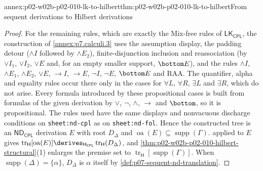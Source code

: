\begin{annexitem}{annex:p02-w02b-p02-010-lk-to-hilbert}{thm:p02-w02b-p02-010-lk-to-hilbert}{From sequent derivations to Hilbert derivations}
\begin{proof}
For the remaining rules, which are exactly the Mix-free rules of
\(\mathsf{LK}_{\mathsf{CPL}}\), the construction of \cref{annex:p7.calculi.3}
uses the assumption display, the padding detour
(\(\land I\) followed by \(\land E_2\)), finite-disjunction inclusion and
reassociation (by \(\lor I_1\), \(\lor I_2\), \(\lor E\) and, for an empty
smaller support, \(\bottom E\)), and the rules \(\land I\), \(\land E_1\),
\(\land E_2\), \(\lor E\), \(\to I\), \(\to E\), \(\neg I\), \(\neg E\),
\(\bottom E\) and RAA.  The quantifier, alpha and equality rules occur there
only in the cases for \(\forall L\), \(\forall R\), \(\exists L\) and
\(\exists R\), which do not arise.  Every formula introduced by these
propositional cases is built from formulas of the given derivation by
\(\lor\), \(\neg\), \(\land\), \(\to\) and \(\bottom\), so it is
propositional.  The rules used have the same displays and nonvacuous
discharge conditions on \texttt{sheet:\allowbreak nd-cpl} as on
\texttt{sheet:\allowbreak nd-fol}.  Hence the constructed tree
is an \(\mathsf{ND}_{\mathsf{CPL}}\) derivation \(E\) with root \(D_\Delta\)
and \(\operatorname{oa}(E)\subseteq\operatorname{supp}(\Gamma)\).
 applied to \(E\) gives
\(\operatorname{tr}_{\mathsf H}[\operatorname{oa}(E)]\derives_{\mathsf H_{\mathsf{CPL}}}
\operatorname{tr}_{\mathsf H}(D_\Delta)\), and
\cref{thm:p02-w02b-p02-010-hilbert-structural}(1) enlarges the premise set
to \(\operatorname{tr}_{\mathsf H}[\operatorname{supp}(\Gamma)]\).  When
\(\operatorname{supp}(\Delta)=\{\alpha\}\), \(D_\Delta\) is \(\alpha\) itself
by \cref{def:p07-sequent-nd-translation}.
\end{proof}
\end{annexitem}

